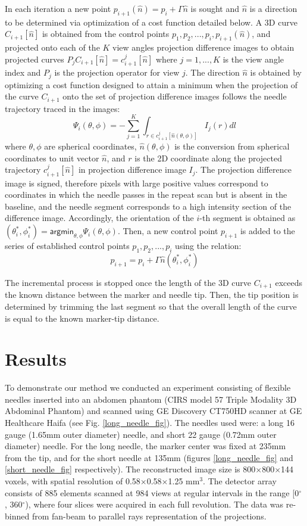 In each iteration a new point $p_{i+1}(\hat{n}) = p_i + \Gamma \hat{n}$ is sought and $\hat{n}$ is a direction to be determined via optimization of a cost function detailed below.
A 3D curve $C_{i+1}[\hat{n}]$ is obtained from the control points $p_1, p_2, ..., p_i, p_{i+1}(\hat{n})$, and projected onto each of the $K$ view angles projection difference images to obtain projected curves $P_j C_{i+1}[\hat{n}] = c_{i+1}^j[\hat{n}]$ where $j=1,...,K$ is the view angle index and $P_j$ is the projection operator for view $j$.
The direction $\hat{n}$ is obtained by optimizing a cost function designed to attain a minimum when the projection of the curve $C_{i+1}$ onto the set of projection difference images follows the needle trajectory traced in the images:
\[ \Psi_i(\theta, \phi) = -\sum_{j=1}^K{\int_{r \in c_{i+1}^j[\hat{n}(\theta, \phi)]} {I_j(r)dl}} \]
where $ \theta, \phi$ are spherical coordinates, $ \hat{n}(\theta, \phi) $ is the conversion from spherical coordinates to unit vector $ \hat{n} $, and $r$ is the 2D coordinate along the projected trajectory $c_{i+1}^j[\hat{n}]$ in projection difference image $I_j$. The projection difference image is signed, therefore pixels with large positive values correspond to coordinates in which the needle passes in the repeat scan but is absent in the baseline, and the needle segment corresponds to a high intensity section of the difference image.
Accordingly, the orientation of the $i$-th segment is obtained as $(\theta_i^*, \phi_i^*) = \textsf{argmin}_{\theta, \phi} \Psi_i ( \theta, \phi)$. Then, a new control point $p_{i+1}$ is added to the series of established control points $p_1, p_2, ..., p_i$ using the relation:
$$ p_{i+1} = p_i + \Gamma \hat{n}(\theta_i^*, \phi_i^*) $$

The incremental process is stopped once the length of the 3D curve $C_{i+1}$ exceeds the known distance between the marker and needle tip. Then, the tip position is determined by trimming the last segment so that the overall length of the curve is equal to the known marker-tip distance.

\section{Results}

To demonstrate our method we conducted an experiment consisting of flexible needles inserted into an abdomen phantom (CIRS model 57 Triple Modality 3D Abdominal Phantom) and scanned using GE Discovery CT750HD scanner at GE Healthcare Haifa (see Fig. \ref{long_needle_fig}). The needles used were: a long 16 gauge (1.65mm outer diameter) needle, and short 22 gauge (0.72mm outer diameter) needle. For the long needle, the marker center was fixed at 235mm from the tip, and for the short needle at 135mm (figures \ref{long_needle_fig} and \ref{short_needle_fig} respectively).
The reconstructed image size is 800$\times$800$\times$144 voxels, with spatial resolution of 0.58$\times$0.58$\times$1.25 mm$^3$. The detector array consists of 885 elements scanned at 984 views at regular intervals in the range [0$^{\circ}$ , 360$^{\circ}$), where four slices were acquired in each full revolution. The data was re-binned from fan-beam to parallel rays representation of the projections.


